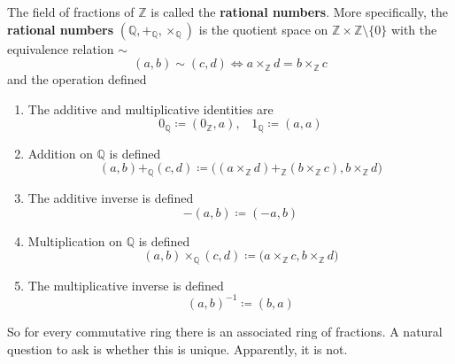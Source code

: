   \begin{definition}
    The field of fractions of $\mathbb{Z}$ is called the \textbf{rational numbers}. More specifically, the \textbf{rational numbers} $(\mathbb{Q}, +_{\mathbb{Q}}, \times_{\mathbb{Q}})$ is the quotient space on $\mathbb{Z} \times \mathbb{Z} \setminus \{0\}$ with the equivalence relation $\sim$ 
    \begin{equation}
      (a, b) \sim (c, d) \iff a \times_{\mathbb{Z}} d = b \times_{\mathbb{Z}} c
    \end{equation} 
    and the operation defined 
    \begin{enumerate}
      \item The additive and multiplicative identities are 
      \begin{equation}
        0_{\mathbb{Q}} \coloneqq (0_{\mathbb{Z}}, a), \;\;\; 1_{\mathbb{Q}} \coloneqq (a, a)
      \end{equation}

      \item Addition on $\mathbb{Q}$ is defined 
      \begin{equation}
        (a, b) +_{\mathbb{Q}} (c, d) \coloneqq \big( (a \times_{\mathbb{Z}} d) +_{\mathbb{Z}} (b \times_{\mathbb{Z}} c), b \times_{\mathbb{Z}} d \big) 
      \end{equation}

      \item The additive inverse is defined 
      \begin{equation}
        -(a, b) \coloneqq (-a, b)
      \end{equation}

      \item Multiplication on $\mathbb{Q}$ is defined 
      \begin{equation}
        (a, b) \times_{\mathbb{Q}} (c, d) \coloneqq \big( a \times_{\mathbb{Z}} c, b \times_{\mathbb{Z}} d \big)
      \end{equation} 

      \item The multiplicative inverse is defined 
      \begin{equation}
        (a, b)^{-1} \coloneqq (b, a)
      \end{equation}
    \end{enumerate}
  \end{definition}

  So for every commutative ring there is an associated ring of fractions. A natural question to ask is whether this is unique. Apparently, it is not. 

